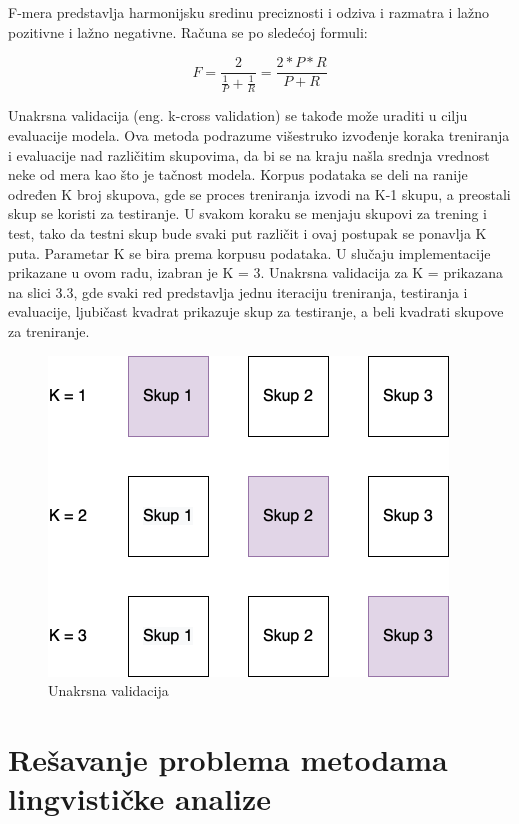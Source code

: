 \documentclass[12pt,oneside]{memoir}
\begin{document}
F-mera predstavlja harmonijsku sredinu preciznosti i odziva i razmatra i lažno pozitivne i lažno negativne.  Računa se po sledećoj formuli:

\begin{equation}
	F = \frac{2}{\frac{1}{P} + \frac{1}{R}} = \frac{2 * P * R }{P + R}
\end{equation}

Unakrsna validacija (eng.  k-cross validation) se takođe može uraditi u cilju evaluacije modela.  Ova metoda podrazume višestruko izvođenje koraka treniranja i evaluacije nad različitim skupovima,  da bi se na kraju našla srednja vrednost neke od mera kao što je tačnost modela.  Korpus podataka se deli na ranije određen K broj skupova, gde se proces treniranja izvodi na K-1 skupu, a preostali skup se koristi za testiranje.  U svakom koraku se menjaju skupovi za trening i test, tako da testni skup bude svaki put različit i ovaj postupak se ponavlja K puta.  Parametar K se bira prema korpusu podataka.
U slučaju implementacije prikazane u ovom radu,  izabran je K = 3. 
Unakrsna validacija za K = prikazana na slici 3.3, gde svaki red predstavlja jednu iteraciju treniranja, testiranja i evaluacije,  ljubičast kvadrat prikazuje skup za testiranje,  a beli kvadrati skupove za treniranje.

\begin{figure}[h!]
\centering
\includegraphics[width=.7\textwidth]{images/K_cross_validation.png}
\caption{ Unakrsna validacija }
\label{Slika}
\end{figure}

\chapter{Rešavanje problema metodama lingvističke analize}
\end{document}
